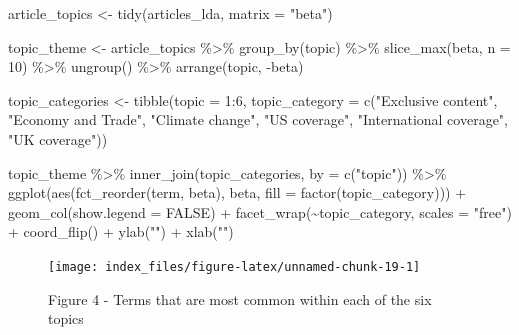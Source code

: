 \documentclass[
]{article}
\newenvironment{Shaded}{\begin{snugshade}}{\end{snugshade}}
\newcommand{\AttributeTok}[1]{\textcolor[rgb]{0.77,0.63,0.00}{#1}}
\newcommand{\ConstantTok}[1]{\textcolor[rgb]{0.00,0.00,0.00}{#1}}
\newcommand{\DecValTok}[1]{\textcolor[rgb]{0.00,0.00,0.81}{#1}}
\newcommand{\FunctionTok}[1]{\textcolor[rgb]{0.00,0.00,0.00}{#1}}
\newcommand{\NormalTok}[1]{#1}
\newcommand{\OtherTok}[1]{\textcolor[rgb]{0.56,0.35,0.01}{#1}}
\newcommand{\SpecialCharTok}[1]{\textcolor[rgb]{0.00,0.00,0.00}{#1}}
\newcommand{\StringTok}[1]{\textcolor[rgb]{0.31,0.60,0.02}{#1}}
\begin{document}
\begin{Shaded}
\begin{Highlighting}[]
\NormalTok{article\_topics }\OtherTok{\textless{}{-}} \FunctionTok{tidy}\NormalTok{(articles\_lda, }\AttributeTok{matrix =} \StringTok{"beta"}\NormalTok{)}

\NormalTok{topic\_theme }\OtherTok{\textless{}{-}}\NormalTok{ article\_topics }\SpecialCharTok{\%\textgreater{}\%}
  \FunctionTok{group\_by}\NormalTok{(topic) }\SpecialCharTok{\%\textgreater{}\%}
  \FunctionTok{slice\_max}\NormalTok{(beta, }\AttributeTok{n =} \DecValTok{10}\NormalTok{) }\SpecialCharTok{\%\textgreater{}\%}
  \FunctionTok{ungroup}\NormalTok{() }\SpecialCharTok{\%\textgreater{}\%}
  \FunctionTok{arrange}\NormalTok{(topic, }\SpecialCharTok{{-}}\NormalTok{beta)}

\NormalTok{topic\_categories }\OtherTok{\textless{}{-}} \FunctionTok{tibble}\NormalTok{(}\AttributeTok{topic =} \DecValTok{1}\SpecialCharTok{:}\DecValTok{6}\NormalTok{, }\AttributeTok{topic\_category =} \FunctionTok{c}\NormalTok{(}\StringTok{"Exclusive content"}\NormalTok{, }\StringTok{"Economy and Trade"}\NormalTok{, }\StringTok{"Climate change"}\NormalTok{, }\StringTok{"US coverage"}\NormalTok{, }\StringTok{"International coverage"}\NormalTok{, }\StringTok{"UK coverage"}\NormalTok{))}

\NormalTok{topic\_theme }\SpecialCharTok{\%\textgreater{}\%}
  \FunctionTok{inner\_join}\NormalTok{(topic\_categories, }\AttributeTok{by =} \FunctionTok{c}\NormalTok{(}\StringTok{"topic"}\NormalTok{)) }\SpecialCharTok{\%\textgreater{}\%}
  \FunctionTok{ggplot}\NormalTok{(}\FunctionTok{aes}\NormalTok{(}\FunctionTok{fct\_reorder}\NormalTok{(term, beta), beta, }\AttributeTok{fill =} \FunctionTok{factor}\NormalTok{(topic\_category))) }\SpecialCharTok{+} 
  \FunctionTok{geom\_col}\NormalTok{(}\AttributeTok{show.legend =} \ConstantTok{FALSE}\NormalTok{) }\SpecialCharTok{+} 
  \FunctionTok{facet\_wrap}\NormalTok{(}\SpecialCharTok{\textasciitilde{}}\NormalTok{topic\_category, }\AttributeTok{scales =} \StringTok{"free"}\NormalTok{) }\SpecialCharTok{+} 
  \FunctionTok{coord\_flip}\NormalTok{() }\SpecialCharTok{+}
  \FunctionTok{ylab}\NormalTok{(}\StringTok{""}\NormalTok{) }\SpecialCharTok{+}
  \FunctionTok{xlab}\NormalTok{(}\StringTok{""}\NormalTok{)}
\end{Highlighting}
\end{Shaded}

\begin{figure}

{\centering \texttt{[image: index\_files/figure-latex/unnamed-chunk-19-1]} 

}

\caption{Figure 4 - Terms that are most common within each of the six topics}\label{fig:unnamed-chunk-19}
\end{figure}
\end{document}
